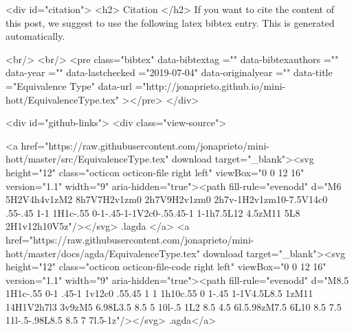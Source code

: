   
  <div id="citation">
  <h2> Citation </h2>
  If you want to cite the content of this post,
  we suggest to use the following latex bibtex entry.
  This is generated automatically.

  <br/>
  <br/>
  <pre class="bibtex"
       data-bibtextag =""
       data-bibtexauthors =""
       data-year =""
       data-lastchecked ="2019-07-04"
       data-originalyear =""
       data-title ="Equivalence Type"
       data-url ="http://jonaprieto.github.io/mini-hott/EquivalenceType.tex"
  ></pre>
  </div>
  

  <div id="github-links">
    <div class="view-source">
      
        <a href="https://raw.githubusercontent.com/jonaprieto/mini-hott/master/src/EquivalenceType.tex" download target="_blank"><svg height="12" class="octicon octicon-file right left" viewBox="0 0 12 16" version="1.1" width="9" aria-hidden="true"><path fill-rule="evenodd" d="M6 5H2V4h4v1zM2 8h7V7H2v1zm0 2h7V9H2v1zm0 2h7v-1H2v1zm10-7.5V14c0 .55-.45 1-1 1H1c-.55 0-1-.45-1-1V2c0-.55.45-1 1-1h7.5L12 4.5zM11 5L8 2H1v12h10V5z"/></svg> .lagda </a>
        <a href="https://raw.githubusercontent.com/jonaprieto/mini-hott/master/docs/agda/EquivalenceType.tex" download target="_blank"><svg height="12" class="octicon octicon-file-code right left" viewBox="0 0 12 16" version="1.1" width="9" aria-hidden="true"><path fill-rule="evenodd" d="M8.5 1H1c-.55 0-1 .45-1 1v12c0 .55.45 1 1 1h10c.55 0 1-.45 1-1V4.5L8.5 1zM11 14H1V2h7l3 3v9zM5 6.98L3.5 8.5 5 10l-.5 1L2 8.5 4.5 6l.5.98zM7.5 6L10 8.5 7.5 11l-.5-.98L8.5 8.5 7 7l.5-1z"/></svg> .agda</a>
      
